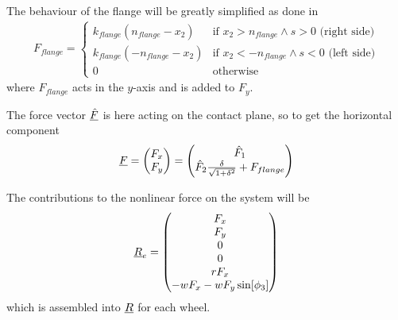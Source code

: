 The behaviour of the flange will be greatly simplified as done in \cite{appwheelrailcurvedtracks_jpombo}
\begin{align}
 F_{flange} = \begin{cases}
               k_{flange}( n_{flange}-x_2) & \text{if } x_2 >  n_{flange} \wedge s > 0 \text{ (right side)}\\
               k_{flange}(-n_{flange}-x_2) & \text{if } x_2 < -n_{flange} \wedge s < 0 \text{ (left side)}\\
               0                           & \text{otherwise}
              \end{cases}
\end{align}
where $F_{flange}$ acts in the $y$-axis and is added to  $F_y$.

The force vector $\underline{\hat{F}}$ is here acting on the contact plane, so to get the horizontal component
\begin{align}
 \underline{F} = \begin{pmatrix}
           F_x\\
           F_y
          \end{pmatrix} =
          \begin{pmatrix}
           \hat{F}_1\\
           \hat{F}_2\frac{\delta}{\sqrt{1+\delta^2}}+F_{flange}
          \end{pmatrix}
\end{align}

The contributions to the nonlinear force on the system will be
\begin{align}
 \underline{R}_e = \begin{pmatrix}
      F_x\\F_y\\0\\ 0\\r F_x\\-w F_x -w F_y \sin[\phi_3]
     \end{pmatrix}
\end{align}
which is assembled into $\underline{R}$ for each wheel.

